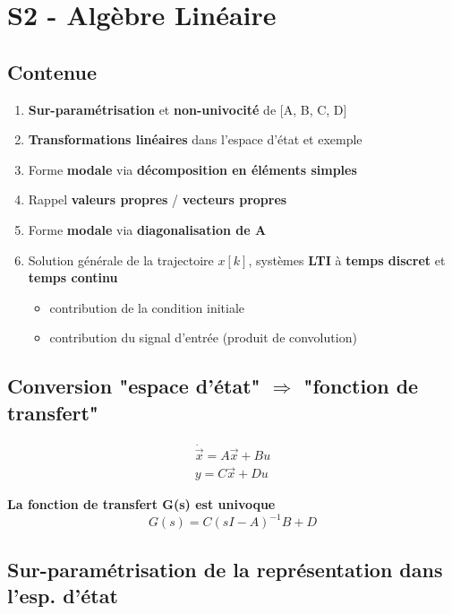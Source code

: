 \documentclass[document.tex]{subfiles}
\begin{document}
\section{S2 - Algèbre Linéaire}

\subsection{Contenue}
\begin{enumerate}
\item \textbf{Sur-paramétrisation} et \textbf{non-univocité} de [A, B, C, D]
\item \textbf{Transformations linéaires} dans l'espace d'état et exemple
\item Forme \textbf{modale} via \textbf{décomposition en éléments simples}
\item Rappel \textbf{valeurs propres} / \textbf{vecteurs propres}
\item Forme \textbf{modale} via \textbf{diagonalisation de A }
\item Solution générale de la trajectoire $x[k]$, systèmes \textbf{LTI} à \textbf{temps discret} et \textbf{temps continu}
\begin{itemize}
	\item contribution de la condition initiale
	\item contribution du signal d'entrée (produit de convolution)
\end{itemize}
\end{enumerate}

\subsection{Conversion "espace d'état" $\Rightarrow$ "fonction de transfert"}

\begin{equation}
	\boxed{
	\begin{array}{l}
		\dot{\vec{x}} = A \vec{x} + B u \\
		y = C \vec{x} + D u
\end{array}		
	}
\end{equation}


\textbf{La fonction de transfert G(s) est univoque}
\begin{equation}
G(s) = C(sI-A)^{-1}B+D
\end{equation}

\subsection{Sur-paramétrisation de la représentation dans l'esp. d'état}
\end{document}
